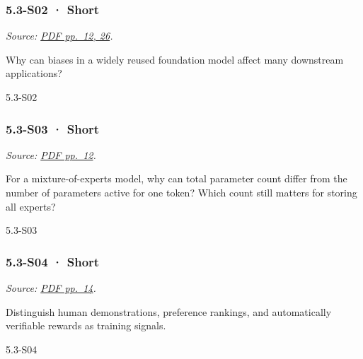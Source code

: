 \noindent\begin{minipage}{\linewidth}

\subsubsection{5.3-S02 · Short}\label{s02-short-14}

\emph{Source:
\href{../Lecture\%20Slides/5.3.\%20Foundation\%20models.pdf\#page=12}{PDF
pp.~12, 26}.}

Why can biases in a widely reused foundation model affect many
downstream applications?

\begin{solution}[20mm]{5.3-S02}

\end{solution}
\end{minipage}\par\medskip

\noindent\begin{minipage}{\linewidth}

\subsubsection{5.3-S03 · Short}\label{s03-short-14}

\emph{Source:
\href{../Lecture\%20Slides/5.3.\%20Foundation\%20models.pdf\#page=12}{PDF
pp.~12}.}

For a mixture-of-experts model, why can total parameter count differ
from the number of parameters active for one token? Which count still
matters for storing all experts?

\begin{solution}[20mm]{5.3-S03}

\end{solution}
\end{minipage}\par\medskip

\noindent\begin{minipage}{\linewidth}

\subsubsection{5.3-S04 · Short}\label{s04-short-14}

\emph{Source:
\href{../Lecture\%20Slides/5.3.\%20Foundation\%20models.pdf\#page=14}{PDF
pp.~14}.}

Distinguish human demonstrations, preference rankings, and automatically
verifiable rewards as training signals.

\begin{solution}[20mm]{5.3-S04}

\end{solution}
\end{minipage}\par\medskip

